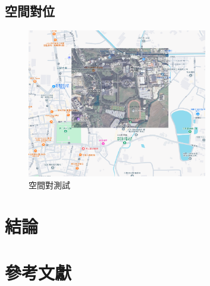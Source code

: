 \documentclass[12pt]{article}       %
\begin{document}
\subsection{空間對位}
\hspace{2em}
\begin{figure}[H]
    \centering
    \includegraphics[width=0.7\textwidth]{1234567890.png}     %
    \caption{空間對測試}    %
    \label{fig:1234567890}    %
\end{figure}

\section{\centering 結論} 
\hspace{2em}



\section{\centering 參考文獻}
\vspace{-3.5em}  %
\renewcommand{\refname}{}  %
\printbibliography  %
\end{document}

